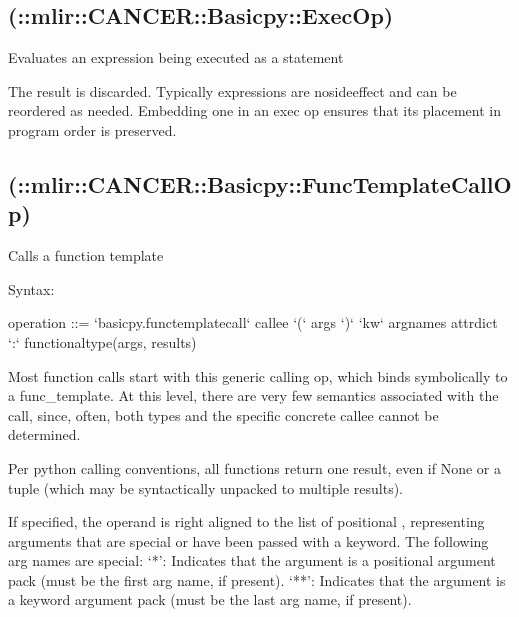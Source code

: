 \documentclass[letterpaper,10pt,english]{sphinxmanual}
\begin{document}
\subsection{ (::mlir::CANCER::Basicpy::ExecOp)}
\label{\detokenize{Basicpy/index:basicpy-exec-mlir-cancer-basicpy-execop}}
\sphinxAtStartPar
Evaluates an expression being executed as a statement

\sphinxAtStartPar
The result is discarded. Typically expressions are no\sphinxhyphen{}side\sphinxhyphen{}effect and
can be re\sphinxhyphen{}ordered as needed. Embedding one in an exec op ensures that
its placement in program order is preserved.


\subsection{ (::mlir::CANCER::Basicpy::FuncTemplateCallOp)}
\label{\detokenize{Basicpy/index:basicpy-func-template-call-mlir-cancer-basicpy-functemplatecallop}}
\sphinxAtStartPar
Calls a function template

\sphinxAtStartPar
Syntax:

\begin{sphinxVerbatim}[commandchars=\\\{\}]
operation ::= `basicpy.func\PYGZus{}template\PYGZus{}call` \PYGZdl{}callee `(` \PYGZdl{}args `)` `kw` \PYGZdl{}arg\PYGZus{}names attr\PYGZhy{}dict `:` functional\PYGZhy{}type(\PYGZdl{}args, results)
\end{sphinxVerbatim}

\sphinxAtStartPar
Most function calls start with this generic calling op, which binds
symbolically to a func\_template. At this level, there are very few
semantics associated with the call, since, often, both types and the
specific concrete callee cannot be determined.

\sphinxAtStartPar
Per python calling conventions, all functions return one result, even if
None or a tuple (which may be syntactically unpacked to multiple
results).

\sphinxAtStartPar
If specified, the  operand is right aligned to the list of
positional , representing arguments that are special or have
been passed with a keyword. The following arg names are special: ‘*’:
Indicates that the argument is a positional argument pack (must be the
first arg name, if present). ‘**’: Indicates that the argument is a
keyword argument pack (must be the last arg name, if present).
\end{document}

